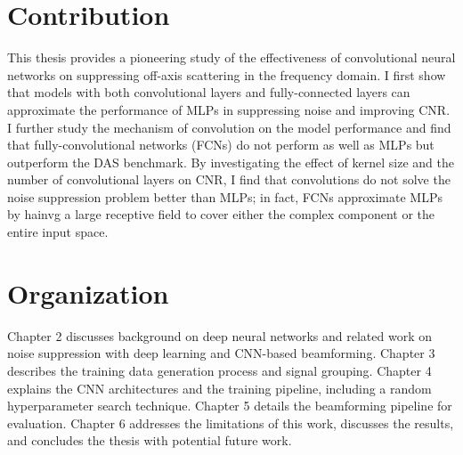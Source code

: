 \section{Contribution} %
This thesis provides a pioneering study of the effectiveness of convolutional neural networks on suppressing off-axis scattering in the frequency domain. I first show that models with both convolutional layers and fully-connected layers can approximate the performance of MLPs in suppressing noise and improving CNR. I further study the mechanism of convolution on the model performance and find that fully-convolutional networks (FCNs) do not perform as well as MLPs but outperform the DAS benchmark. By investigating the effect of kernel size and the number of convolutional layers on CNR, I find that convolutions do not solve the noise suppression problem better than MLPs; in fact, FCNs approximate MLPs by hainvg a large receptive field to cover either the complex component or the entire input space.
%

\section{Organization}
Chapter 2 discusses background on deep neural networks and related work on noise suppression with deep learning and CNN-based beamforming. Chapter 3 describes the training data generation process and signal grouping. Chapter 4 explains the CNN architectures and the training pipeline, including a random hyperparameter search technique. Chapter 5 details the beamforming pipeline for evaluation. Chapter 6 addresses the limitations of this work, discusses the results, and concludes the thesis with potential future work.
